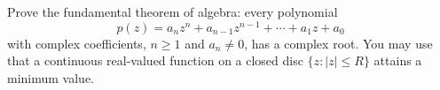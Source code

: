Prove the fundamental theorem of algebra: every polynomial
\[p(z)=a_nz^n+a_{n-1}z^{n-1}+\cdots+a_1z+a_0\]
with complex coefficients, $n\ge1$ and $a_n\ne0$, has a complex root. You may use that a continuous real-valued function on a closed disc $\{z:|z|\le R\}$ attains a minimum value.
